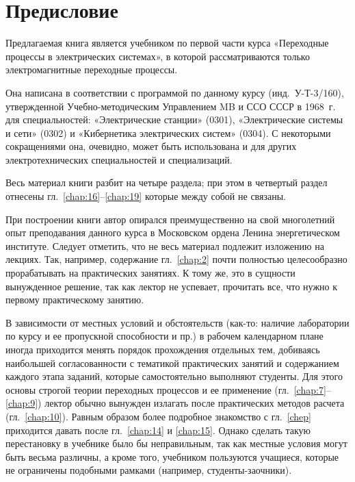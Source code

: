 \chapter*{Предисловие}
\label{chap:preface}

Предлагаемая книга является учебником по первой части курса «Переходные процессы в электрических системах», в которой рассматриваются только электромагнитные переходные процессы.

Она написана в соответствии с программой по данному курсу (инд.~У-Т-3/160), утвержденной Учебно-методическим Управлением MB и ССО СССР в 1968~г. для специальностей: «Электрические станции» (0301), «Электрические системы и сети» (0302) и «Кибернетика электрических систем» (0304). С некоторыми сокращениями она, очевидно, может быть использована и для других электротехнических специальностей и специализаций.

Весь материал книги разбит на четыре раздела; при этом в четвертый раздел отнесены гл.~\ref{chap:16}--\ref{chap:19} которые между собой не связаны.

При построении книги автор опирался преимущественно на свой многолетний опыт преподавания данного курса в Московском ордена Ленина энергетическом институте. Следует отметить, что не весь материал подлежит изложению на лекциях. Так, например, содержание гл.~\ref{chap:2} почти полностью целесообразно прорабатывать на практических занятиях. К тому же, это в сущности вынужденное решение, так как лектор не успевает, прочитать все, что нужно к первому практическому занятию.

В зависимости от местных условий и обстоятельств (как-то: наличие лаборатории по курсу и ее пропускной способности и пр.) в рабочем календарном плане иногда приходится менять порядок прохождения отдельных тем, добиваясь наибольшей согласованности с тематикой практических занятий и содержанием каждого этапа заданий, которые самостоятельно выполняют студенты. Для этого основы строгой теории переходных процессов и ее применение (гл.~\ref{chap:7}--\ref{chap:9}) лектор обычно вынужден излагать после практических методов расчета (гл.~\ref{chap:10}). Равным образом более подробное знакомство с гл.~\ref{chep} приходится давать после гл.~\ref{chap:14} и \ref{chap:15}. Однако сделать такую перестановку в учебнике было бы неправильным, так как местные условия могут быть весьма различны, а кроме того, учебником пользуются учащиеся, которые не ограничены подобными рамками (например, студенты-заочники).


